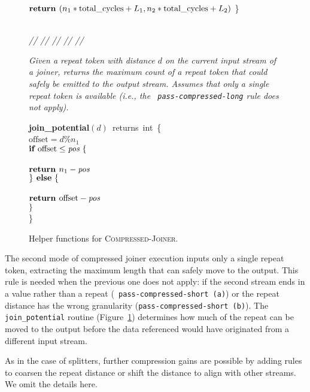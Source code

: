 \begin{figure}[t]
\tab$\mbox{\bf return~}(n_1*\mbox{total\_cycles} + L_1, n_2*\mbox{total\_cycles} + L_2)$
\}\\
~ \\
\begin{minipage}{0.1in}
\vspace{-1.75pt}
{\it // // // // //}
\end{minipage}
\begin{minipage}{3.23in}
{\it Given a repeat token with distance $d$ on the current input
  stream of a joiner, returns the maximum count of a repeat token that
  could safely be emitted to the output stream.  Assumes that only a
  single repeat token is available (i.e., the {\tt
    pass-compressed-long} rule does not apply).}
\end{minipage}
\mbox{\bf join\_potential}$(d)$~returns~int~\{\\
\tab$\mbox{offset} = d$\%$n_1$\\
\tab$\mbox{{\bf if~}} \mbox{offset} \leq \mbox{\it pos} ~\{$\\
\tab{}\\
\tab\tab$\mbox{\bf return~} n_1 - \mbox{\it pos}$\\
\tab$\} \mbox{\bf ~else} ~\{$\\
\tab{}\\
\tab\tab$\mbox{\bf return~} \mbox{offset} - \mbox{\it pos}$\\
\tab$\}$\\
\}
\caption{Helper functions for \textsc{Compressed-Joiner}.
\protect\label{fig:helper-joiner}}
\end{figure}

The second mode of compressed joiner execution inputs only a single
repeat token, extracting the maximum length that can safely move to
the output.  This rule is needed when the previous one does not apply:
if the second stream ends in a value rather than a repeat ({\tt
  pass-compressed-short (a)}) or the repeat distance has the wrong
granularity ({\tt pass-compressed-short (b)}).  The {\tt
  join\_potential} routine (Figure~\ref{fig:helper-joiner}) determines
how much of the repeat can be moved to the output before the data
referenced would have originated from a different input stream.

As in the case of splitters, further compression gains are possible by
adding rules to coarsen the repeat distance or shift the distance to
align with other streams.  We omit the details here.
